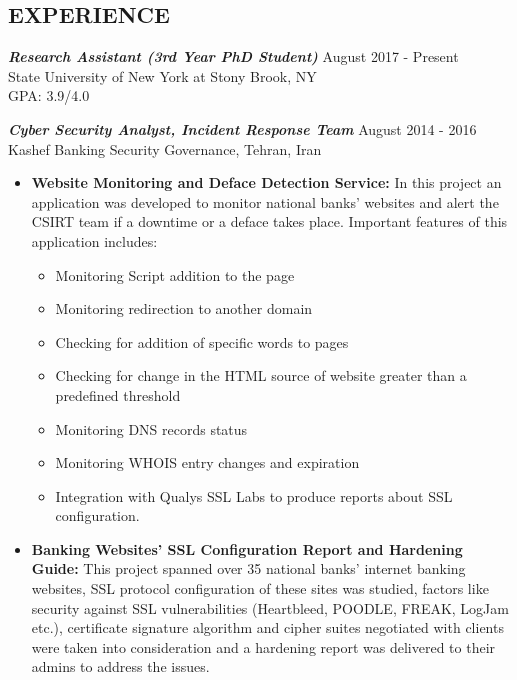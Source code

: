 \documentclass[margin, 10pt]{res} %
\begin{document}
\begin{resume}
 
\section{EXPERIENCE}

{\sl \textbf{Research Assistant (3rd Year PhD Student)}} \hfill August 2017 - Present \\
State University of New York at Stony Brook, NY \\
GPA: 3.9/4.0

{\sl \textbf{Cyber Security Analyst, Incident Response Team}} \hfill August 2014 - 2016 \\
Kashef  Banking  Security  Governance, Tehran, Iran\\
\begin{itemize} \itemsep -2pt %
\item \textbf{Website Monitoring and Deface Detection Service:} In  this  project  an  application  was  developed  to  monitor  national  banks’  websites and  alert  the  CSIRT  team  if  a  downtime  or  a  deface  takes  place. Important features of this application includes: 
    \begin{itemize} \itemsep -2pt %
        \item Monitoring Script addition to the  page
        \item Monitoring redirection  to another  domain
        \item Checking for addition of specific  words to pages
        \item Checking for change in the HTML source of website greater than a predefined threshold
        \item Monitoring DNS records status
        \item Monitoring WHOIS entry changes and expiration
        \item Integration with Qualys SSL Labs to produce reports about SSL configuration.
    \end{itemize}
\end{itemize}

\begin{itemize} \itemsep -2pt %
\item \textbf{Banking Websites’ SSL Configuration Report and Hardening Guide:} This  project  spanned  over  35  national  banks’  internet  banking  websites,  SSL protocol configuration of these sites was studied, factors like security against SSL vulnerabilities  (Heartbleed,  POODLE,  FREAK,  LogJam  etc.),  certificate  signature algorithm  and  cipher  suites  negotiated  with  clients  were  taken  into  consideration and  a  hardening  report  was  delivered  to  their  admins  to  address  the  issues.
\end{itemize}


\end{resume}
\end{document}
